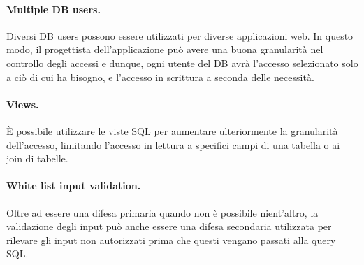 \paragraph{Multiple DB users.}
Diversi DB users possono essere utilizzati per diverse applicazioni web.
In questo modo, il progettista dell'applicazione può avere una buona granularità
nel controllo degli accessi e dunque,
ogni utente del DB avrà l'accesso selezionato solo a ciò di cui ha bisogno, e
l'accesso in scrittura a seconda delle necessità.

\paragraph{Views.}
È possibile utilizzare le viste SQL per aumentare ulteriormente la granularità
dell'accesso, limitando l'accesso in lettura a specifici campi di una tabella o
ai join di tabelle.

\paragraph{White list input validation.}
Oltre ad essere una difesa primaria quando non è possibile nient'altro,
la validazione degli
input può anche essere una difesa secondaria utilizzata per rilevare gli input
non autorizzati
prima che questi vengano passati alla query SQL.